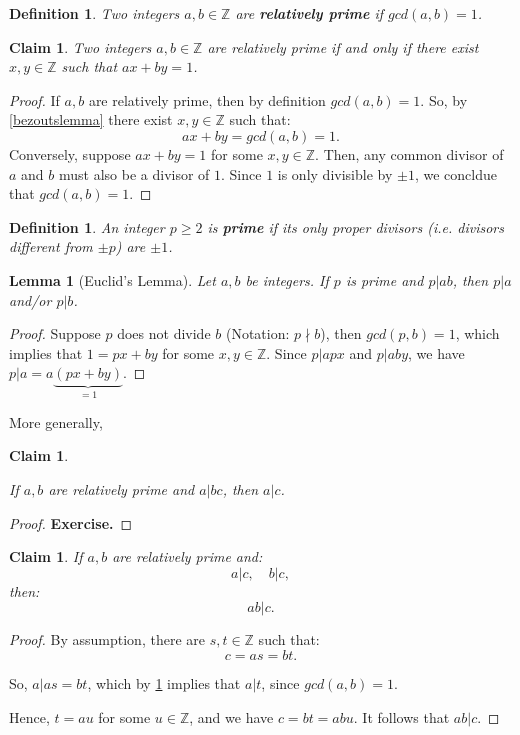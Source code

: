 \documentclass[a4paper,12pt]{report}
\newcounter{statement}
\numberwithin{statement}{chapter}
\newtheorem{defn}[statement]{Definition}
\newtheorem{lemma}[statement]{Lemma}
\newtheorem{claim}[statement]{Claim}
\numberwithin{equation}{chapter}
\numberwithin{section}{chapter}
\numberwithin{subsection}{section}
\begin{document}
\begin{defn}
Two integers $a, b \in \mathbb{Z}$ are  {\bf relatively prime}  if $gcd(a, b) = 1$.
\end{defn}
\begin{claim}

Two integers $a, b \in \mathbb{Z}$ are relatively prime if and only if there exist $x, y \in \mathbb{Z}$
such that $ax + by = 1$.

\end{claim}
\begin{proof}

If $a, b$ are relatively prime, then by definition $gcd(a, b) = 1$.
So, by \cref{bezoutslemma}  there exist $x, y \in \mathbb{Z}$ such that:
\[ax + by = gcd(a, b) = 1.\]
Conversely,
suppose $ax + by = 1$ for some $x, y \in \mathbb{Z}$.
Then, any common divisor of $a$ and $b$ must also be a divisor of $1$.
Since $1$ is only divisible by $\pm 1$, we concldue that $gcd(a, b) = 1$.
\end{proof}

\begin{defn}
An integer $p \geq 2$ is  {\bf  prime} 
if its only proper divisors (i.e. divisors different from $\pm p$)
are $\pm 1$.
\end{defn}
\begin{lemma}[Euclid's Lemma]






Let $a, b$ be integers.
If $p$ is prime and $p | ab$, then $p|a$ and/or $p|b$.

\end{lemma}
\begin{proof}

Suppose $p$ does not divide $b$ (Notation: $p\nmid b$), then $gcd(p, b) = 1$,
which implies that $1 = px + by$ for some $x, y \in \mathbb{Z}$.
Since $p | apx$ and $p | aby$, we have $p | a = a\underbrace{(px + by)}_{= 1}$.


\end{proof}

More generally,
\begin{claim}
\label{euclidslemmageneral}


If $a, b$ are relatively prime and $a | bc$, then $a | c$.
\end{claim}
\begin{proof}
 {\bf Exercise.} 
\end{proof}
\begin{claim}

If $a, b$ are relatively prime and:
\[
a | c, \quad b | c,
\]
then:
\[
ab | c.
\]
\end{claim}
\begin{proof}

By assumption, there are $s, t \in \mathbb{Z}$ such that:
\[
c = as = bt.
\]

So, $a | as = bt$,
which by
\cref{euclidslemmageneral}
implies that $a | t$, since $gcd(a, b) = 1$.




Hence, $t = au$ for some $u \in \mathbb{Z}$, and we have $c = bt = ab u$.
It follows that $ab | c$.


\end{proof}
\end{document}
